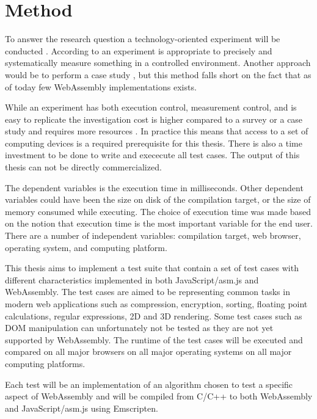 \section{Method}
\label{method}

To answer the research question a technology-oriented experiment will be conducted \parencite{WohlinRunesonHostOhlssonRegnellWesslen2012}. According to \textcite{WohlinRunesonHostOhlssonRegnellWesslen2012} an experiment is appropriate to precisely and systematically measure something in a controlled environment. Another approach would be to perform a case study \parencite{WohlinRunesonHostOhlssonRegnellWesslen2012}, but this method falls short on the fact that as of today few WebAssembly implementations exists.

While an experiment has both execution control, measurement control, and is easy to replicate the investigation cost is higher compared to a survey or a case study and requires more resources \parencite{WohlinRunesonHostOhlssonRegnellWesslen2012}. In practice this means that access to a set of computing devices is a required prerequisite for this thesis. There is also a time investment to be done to write and exececute all test cases. The output of this thesis can not be directly commercialized.

The dependent variables is the execution time in milliseconds. Other dependent variables could have been the size on disk of the compilation target, or the size of memory consumed while executing. The choice of execution time was made based on the notion that execution time is the most important variable for the end user. There are a number of independent variables: compilation target, web browser, operating system, and computing platform.

This thesis aims to implement a test suite that contain a set of test cases with different characteristics implemented in both JavaScript/asm.js and WebAssembly. The test cases are aimed to be representing common tasks \parencite{WohlinRunesonHostOhlssonRegnellWesslen2012} in modern web applications such as compression, encryption, sorting, floating point calculations, regular expressions, 2D and 3D rendering. Some test cases such as DOM manipulation can unfortunately not be tested as they are not yet supported by WebAssembly. The runtime of the test cases will be executed and compared on all major browsers on all major operating systems on all major computing platforms.

Each test will be an implementation of an algorithm chosen to test a specific aspect of WebAssembly and will be compiled from C/C++ to both WebAssembly and JavaScript/asm.js using Emscripten.

